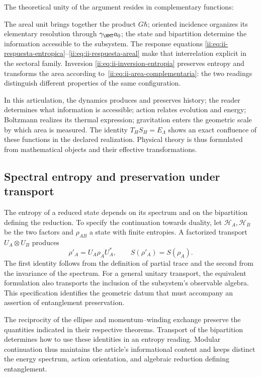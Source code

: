 The theoretical unity of the argument resides in complementary functions:

The areal unit brings together the product $G\hbar$; oriented incidence
organizes its elementary resolution through $\gamma_{\HMT}a_0$; the
state and bipartition determine the information accessible to the
subsystem. The response equations
\eqref{ii:eq:ii-respuesta-entropica}--\eqref{ii:eq:ii-respuesta-areal}
make that interrelation explicit in the sectoral family. Inversion
\eqref{ii:eq:ii-inversion-entropia} preserves entropy and transforms
the area according to~\eqref{ii:eq:ii-area-complementaria}: the two readings
distinguish different properties of the same configuration.

In this articulation,
the dynamics produces and preserves history; the reader determines what
information is accessible; action relates evolution and energy;
Boltzmann realizes its thermal expression; gravitation enters
the geometric scale by which area is measured. The identity
\(T_HS_H=E_\Lambda\) shows an exact confluence of these functions
in the declared realization. Physical theory is thus formulated from
mathematical objects and their effective transformations.

\subsection{Spectral entropy and preservation under transport}

The entropy of a reduced state depends on its spectrum and on the bipartition defining the reduction. To specify the continuation towards duality, let \(\mathcal H_A,\mathcal H_B\) be the two factors and \(\rho_{AB}\) a state with finite entropies. A factorized transport \(U_A\otimes U_B\) produces
\[
 \rho'_A=U_A\rho_AU_A^*,\qquad S(\rho'_A)=S(\rho_A).
\]
The first identity follows from the definition of partial trace and the second from the invariance of the spectrum. For a general unitary transport, the equivalent formulation also transports the inclusion of the subsystem's observable algebra. This specification identifies the geometric datum that must accompany an assertion of entanglement preservation.

The reciprocity of the ellipse and momentum--winding exchange
preserve the quantities indicated in their respective theorems. Transport
of the bipartition determines how to use these identities
in an entropy reading. Modular continuation thus
maintains the article's informational content and keeps distinct
the energy spectrum, action orientation, and algebraic reduction
defining entanglement.

